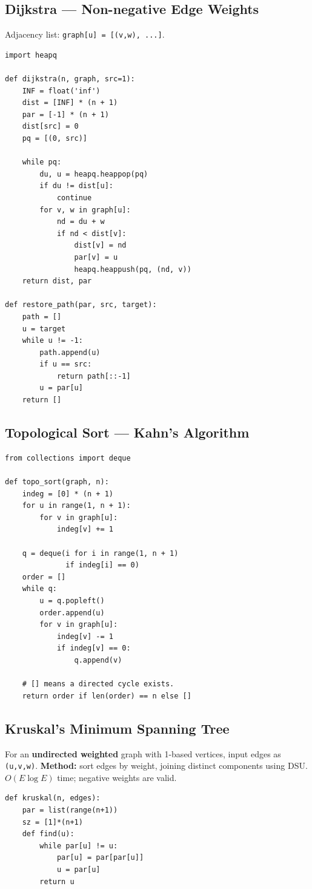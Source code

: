 \documentclass[9pt,a4paper]{extarticle}
\newcommand{\code}[1]{\texttt{#1}}
\begin{document}
\begin{multicols}{2}
\subsection{Dijkstra --- Non-negative Edge Weights}
Adjacency list: \code{graph[u] = [(v,w), ...]}.
\begin{lstlisting}
import heapq

def dijkstra(n, graph, src=1):
    INF = float('inf')
    dist = [INF] * (n + 1)
    par = [-1] * (n + 1)
    dist[src] = 0
    pq = [(0, src)]

    while pq:
        du, u = heapq.heappop(pq)
        if du != dist[u]:
            continue
        for v, w in graph[u]:
            nd = du + w
            if nd < dist[v]:
                dist[v] = nd
                par[v] = u
                heapq.heappush(pq, (nd, v))
    return dist, par

def restore_path(par, src, target):
    path = []
    u = target
    while u != -1:
        path.append(u)
        if u == src:
            return path[::-1]
        u = par[u]
    return []
\end{lstlisting}

\par\noindent\begin{minipage}[t]{\linewidth}
\subsection{Topological Sort --- Kahn's Algorithm}
\begin{lstlisting}
from collections import deque

def topo_sort(graph, n):
    indeg = [0] * (n + 1)
    for u in range(1, n + 1):
        for v in graph[u]:
            indeg[v] += 1

    q = deque(i for i in range(1, n + 1)
              if indeg[i] == 0)
    order = []
    while q:
        u = q.popleft()
        order.append(u)
        for v in graph[u]:
            indeg[v] -= 1
            if indeg[v] == 0:
                q.append(v)

    # [] means a directed cycle exists.
    return order if len(order) == n else []
\end{lstlisting}
\end{minipage}\par

\par\noindent\begin{minipage}[t]{\linewidth}
\subsection{Kruskal's Minimum Spanning Tree}
For an \textbf{undirected weighted} graph with 1-based vertices,
input edges as \code{(u,v,w)}. \textbf{Method:} sort edges
by weight, joining distinct components using DSU.
$O(E\log E)$ time; negative weights are valid.
\begin{lstlisting}
def kruskal(n, edges):
    par = list(range(n+1))
    sz = [1]*(n+1)
    def find(u):
        while par[u] != u:
            par[u] = par[par[u]]
            u = par[u]
        return u


\end{lstlisting}
\end{minipage}
\end{multicols}
\end{document}
